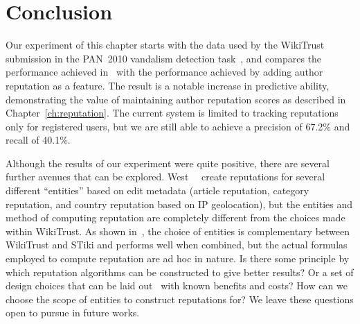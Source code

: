 \section{Conclusion}

Our experiment of this chapter starts with the data used by the
WikiTrust submission in the PAN~2010 vandalism detection
task~\cite{Adler2010b}, and compares the performance achieved
in~\cite{Potthast2010b}
with the performance achieved by adding author reputation as a feature.
The result is a notable increase in predictive ability, demonstrating
the value of maintaining author reputation scores as described in
Chapter~\ref{ch:reputation}.
The current system is limited to tracking reputations only for
registered users, but we are still able to achieve a precision of 67.2\%
and recall of 40.1\%.

Although the results of our experiment were quite positive, there are
several further avenues that can be explored.
West~\etal~\cite{West2010} create reputations for several different
``entities'' based on edit metadata (\eg article reputation, category
reputation, and country reputation based on IP geolocation), but the
entities and method of computing reputation are completely different
from the choices made within WikiTrust.
As shown in~\cite{Adler2011a}, the choice of entities is complementary
between WikiTrust and STiki and performs well when combined, but the
actual formulas employed to compute reputation are ad hoc in nature.
Is there some principle by which reputation algorithms can be
constructed to give better results?
Or a set of design choices that can be laid out~\cite{Adler2011b} with
known benefits and costs?
How can we choose the scope of entities to construct reputations for?
We leave these questions open to pursue in future works.


